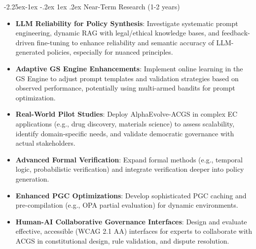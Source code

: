 \documentclass[manuscript,screen,9pt]{acmart}
\makeatletter
\renewcommand\subsection{\@startsection{subsection}{2}{\z@}%
  {-2.25ex\@plus -1ex \@minus -.2ex}%
  {1ex \@plus .2ex}%
  {\normalfont\large\bfseries}}
\makeatother
\begin{document}
\subsection{Near-Term Research (1-2 years)}
\label{subsec:near_term_research}
\begin{itemize}[leftmargin=*,itemsep=1pt,parsep=1pt]
    \item \textbf{LLM Reliability for Policy Synthesis}: Investigate systematic prompt engineering, dynamic RAG with legal/ethical knowledge bases, and feedback-driven fine-tuning to enhance reliability and semantic accuracy of LLM-generated policies, especially for nuanced principles.
    \item \textbf{Adaptive GS Engine Enhancements}: Implement online learning in the GS Engine to adjust prompt templates and validation strategies based on observed performance, potentially using multi-armed bandits for prompt optimization.
    \item \textbf{Real-World Pilot Studies}: Deploy AlphaEvolve-ACGS in complex EC applications (e.g., drug discovery, materials science) to assess scalability, identify domain-specific needs, and validate democratic governance with actual stakeholders.
    \item \textbf{Advanced Formal Verification}: Expand formal methods (e.g., temporal logic, probabilistic verification) and integrate verification deeper into policy generation.
    \item \textbf{Enhanced PGC Optimizations}: Develop sophisticated PGC caching and pre-compilation (e.g., OPA partial evaluation) for dynamic environments.
    \item \textbf{Human-AI Collaborative Governance Interfaces}: Design and evaluate effective, accessible (WCAG 2.1 AA) interfaces for experts to collaborate with ACGS in constitutional design, rule validation, and dispute resolution.
\end{itemize}
\end{document}
